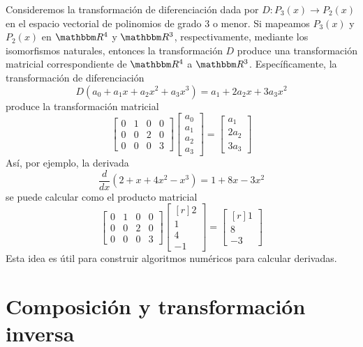 \begin{example}
    Consideremos la transformación de diferenciación dada por $D: P_3(x) \longrightarrow P_2(x)$ en el espacio vectorial de polinomios de grado $3$ o menor. Si mapeamos $P_3(x)$ y $P_2(x)$ en $\RR[4]$ y $\RR[3]$, respectivamente, mediante los isomorfismos naturales, entonces la transformación $D$ produce una transformación matricial correspondiente de $\RR[4]$ a $\RR[3]$. Específicamente, la transformación de diferenciación
    $$D(a_0 + a_1x + a_2x^2 + a_3x^3) = a_1 + 2a_2x + 3a_3x^2$$
    produce la transformación matricial
    $$\begin{bmatrix}
        0 & 1 & 0 & 0 \\
        0 & 0 & 2 & 0 \\
        0 & 0 & 0 & 3
    \end{bmatrix}\begin{bmatrix}
        a_0 \\
        a_1 \\
        a_2 \\
        a_3
    \end{bmatrix} = \begin{bmatrix}
        a_1 \\
        2a_2 \\
        3a_3
    \end{bmatrix}$$
    Así, por ejemplo, la derivada
    $$\frac{d}{dx}(2 + x + 4x^2 - x^3) = 1 + 8x - 3x^2$$
    se puede calcular como el producto matricial
    $$\begin{bmatrix}
        0 & 1 & 0 & 0 \\
        0 & 0 & 2 & 0 \\
        0 & 0 & 0 & 3
    \end{bmatrix}\begin{bmatrix*}[r]
        2 \\
        1 \\
        4 \\
        -1
    \end{bmatrix*} = \begin{bmatrix*}[r]
        1 \\
        8 \\
        -3
    \end{bmatrix*}$$
    Esta idea es útil para construir algoritmos numéricos para calcular derivadas.
\end{example}

\newpage

\section{Composición y transformación inversa}

